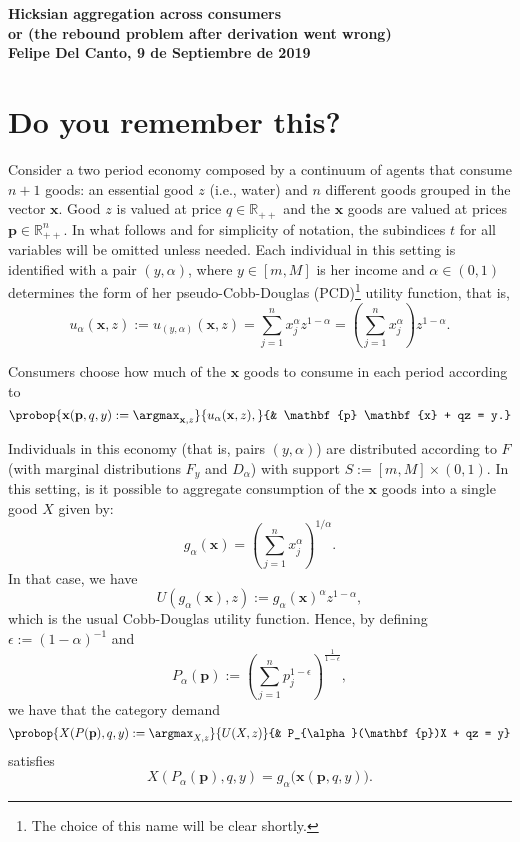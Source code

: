 \documentclass[english, a4paper,12pt]{article}
\begin{document}
\begin{center} \bf \large
	Hicksian aggregation across consumers \\ or (the rebound problem after derivation went wrong) \\ Felipe Del Canto, 9 de Septiembre de 2019
\end{center}

\section{Do you remember this?}
Consider a two period economy composed by a continuum of agents that consume $n+1$ goods: an essential good $z$ (i.e., water) and $n$ different goods grouped in the vector $\mathbf{x}$. Good $z$ is valued at price $q \in \mathbb{R}_{++}$ and the $\mathbf{x}$ goods are valued at prices $\mathbf{p} \in \mathbb{R}^{n}_{++}$.  In what follows and for simplicity of notation, the subindices $t$ for all variables will be omitted unless needed. Each individual in this setting is identified with a pair $(y,\alpha)$, where $y \in [m,M]$ is her income and $\alpha \in (0,1)$ determines the form of her pseudo-Cobb-Douglas (PCD)\footnote{The choice of this name will be clear shortly.} utility function, that is,
	$$u_{\alpha}(\mathbf{x},z) := u_{(y,\alpha)}(\mathbf{x},z) = \sum_{j=1}^{n} x_{j}^{\alpha}z^{1-\alpha} = \left(\sum_{j=1}^{n} x_{j}^{\alpha}\right)z^{1-\alpha}.$$

Consumers choose how much of the $\mathbf{x}$ goods to consume in each period according to
	\begin{equation} \label{eq:probdisagg}
		\probop{\mathbf{x}(\mathbf{p}, q, y) 
			:= \argmax_{\mathbf{x}, z}}{u_{\alpha}(\mathbf{x}, z),}
				{&	\mathbf{p} \mathbf{x} + qz = y.}
	\end{equation} 

Individuals in this economy (that is, pairs $(y,\alpha)$) are distributed according to $F$ (with marginal distributions $F_{y}$ and $D_{\alpha}$) with support $S := [m,M] \times  (0,1)$. In this setting, is it possible to aggregate consumption of the $\mathbf{x}$ goods into a single good $X$ given by: 
	$$g_{\alpha}(\mathbf{x}) = \left(\sum_{j=1}^{n} x_{j}^{\alpha}\right)^{1/\alpha}.$$
In that case, we have
	$$U(g_{\alpha}(\mathbf{x}), z) := g_{\alpha}(\mathbf{x})^{\alpha}z^{1-\alpha},$$
which is the usual Cobb-Douglas utility function. Hence, by defining $\epsilon := (1-\alpha)^{-1}$ and
	$$P_{\alpha}(\mathbf{p}) :=  \left( \sum_{j=1}^{n} p_{j}^{1-\epsilon} \right)^{\frac{1}{1-\epsilon}},$$
we have that the category demand
	\begin{equation} \label{eq:probagg}
		\probop{X(P(\mathbf{p}), q, y) := \argmax_{X, z}}{U(X,z)}
										{&	P_{\alpha}(\mathbf{p})X + qz = y}
	\end{equation}
satisfies
	\begin{equation} \label{eq:aggequality}
		X(P_{\alpha}(\mathbf{p}), q, y) = g_{\alpha}\big(\mathbf{x}(\mathbf{p}, q, y)\big).
	\end{equation}
\end{document}
